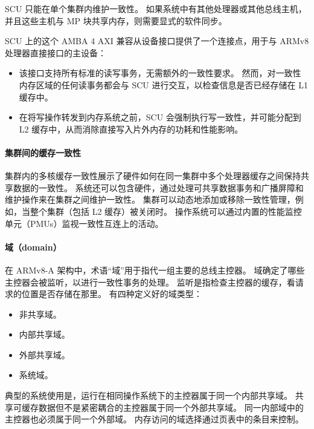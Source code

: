 SCU 只能在单个集群内维护一致性。
如果系统中有其他处理器或其他总线主机，并且这些主机与 MP 块共享内存，则需要显式的软件同步。

SCU 上的这个 AMBA 4
AXI 兼容从设备接口提供了一个连接点，用于与 ARMv8 处理器直接接口的主设备：

\begin{itemize}
\item
  该接口支持所有标准的读写事务，无需额外的一致性要求。
  然而，对一致性内存区域的任何读事务都会与 SCU 进行交互，以检查信息是否已经存储在 L1 缓存中。
\item
  在将写操作转发到内存系统之前，SCU 会强制执行写一致性，并可能分配到 L2 缓存中，从而消除直接写入片外内存的功耗和性能影响。
\end{itemize}

\paragraph*{集群间的缓存一致性}

集群内的多核缓存一致性展示了硬件如何在同一集群中多个处理器缓存之间保持共享数据的一致性。
系统还可以包含硬件，通过处理可共享数据事务和广播屏障和维护操作来在集群之间维护一致性。
集群可以动态地添加或移除一致性管理，例如，当整个集群（包括 L2 缓存）被关闭时。
操作系统可以通过内置的性能监控单元（PMUs）监视一致性互连上的活动。

\paragraph*{域（domain）}

在 ARMv8-A 架构中，术语“域”用于指代一组主要的总线主控器。
域确定了哪些主控器会被监听，以进行一致性事务的处理。
监听是指检查主控器的缓存，看请求的位置是否存储在那里。
有四种定义好的域类型：

\begin{itemize}
\item
  非共享域。
\item
  内部共享域。
\item
  外部共享域。
\item
  系统域。
\end{itemize}

典型的系统使用是，运行在相同操作系统下的主控器属于同一个内部共享域。
共享可缓存数据但不是紧密耦合的主控器属于同一个外部共享域。
同一内部域中的主控器也必须属于同一个外部域。
内存访问的域选择通过页表中的条目来控制。


